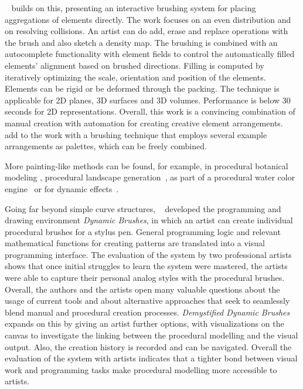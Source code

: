  \citeauthor*{hsu_2020_aef}~\cite{hsu_2020_aef} builds on this, presenting an interactive brushing system for placing aggregations of elements directly. The work focuses on an even distribution and on resolving collisions. An artist can do add, erase and replace operations with the brush and also sketch a density map. The brushing is combined with an autocomplete functionality with element fields to control the automatically filled elements' alignment based on brushed directions. Filling is computed by iteratively optimizing the scale, orientation and position of the elements. Elements can be rigid or be deformed through the packing. The technique is applicable for 2D planes, 3D surfaces and 3D volumes. Performance is below 30 seconds for 2D representations. Overall, this work is a convincing combination of manual creation with automation for creating creative element arrangements. \citeauthor*{davison_2019_ief}~\cite{davison_2019_ief} add to the work with a brushing technique that employs several example arrangements as palettes, which can be freely combined. 

More painting-like methods can be found, for example, in procedural botanical modeling \cite{anastacio_2008_spl,chen_2008_stm,palubicki_2009_sot}, procedural landscape generation~\cite{emilien_2015_wie}, as part of a procedural water color engine~\cite{diverdi_2013_ppp} or for dynamic effects~\cite{xing_2016_eit}. 

Going far beyond simple curve structures, \citeauthor*{jacobs_2018_dbe}~\cite{jacobs_2018_dbe} developed the programming and drawing environment \textit{Dynamic Brushes}, in which an artist can create individual procedural brushes for a stylus pen. General programming logic and relevant mathematical functions for creating patterns are translated into a visual programming interface. The evaluation of the system by two professional artists shows that once initial struggles to learn the system were mastered, the artists were able to capture their personal analog styles with the procedural brushes. Overall, the authors and the artists open many valuable questions about the usage of current tools and about alternative approaches that seek to seamlessly blend manual and procedural creation processes. \textit{Demystified Dynamic Brushes}~\cite{li_2020_sva} expands on this by giving an artist further options, \eg with visualizations on the canvas to investigate the linking between the procedural modelling and the visual output. Also, the creation history is recorded and can be navigated. Overall the evaluation of the system with artists indicates that a tighter bond between visual work and programming tasks make procedural modelling more accessible to artists.

